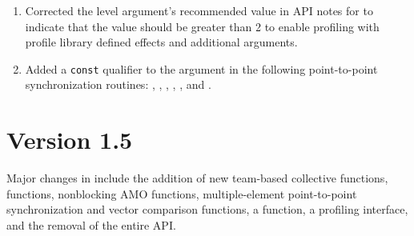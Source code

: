 \begin{enumerate}
%
\item Corrected the level argument's recommended value in API notes for
     to indicate that the value should be greater than
    2 to enable profiling with profile library defined effects and
    additional arguments. \label{changelog:pcontrol}
%
\item Added a \texttt{const} qualifier to the  argument in the
    following point-to-point synchronization routines:
    ,
    ,
    ,
    , , and
    . \label{changelog:p2p_vector_const}
%
%

\end{enumerate}

\section{Version 1.5}
Major changes in \openshmem[1.5] include the addition of new team-based
collective functions,  functions, nonblocking \ac{AMO}
functions, multiple-element point-to-point synchronization and vector
comparison functions, a  function, a profiling
interface, and the removal of the entire \Fortran \ac{API}.

